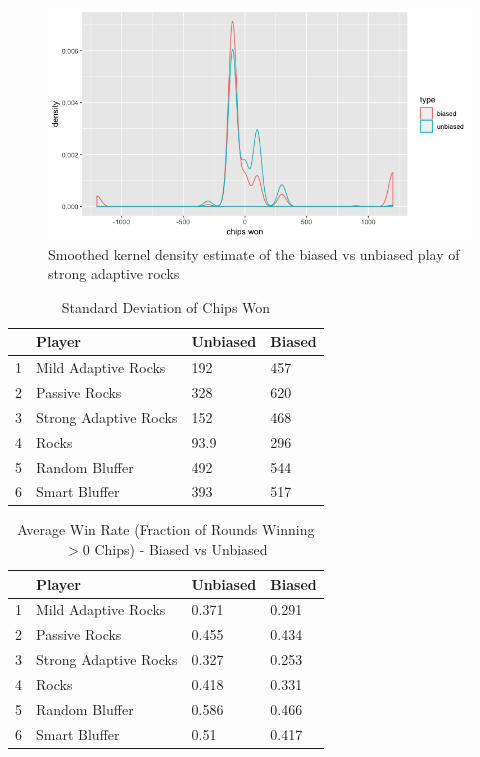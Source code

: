 \documentclass{article}
\begin{document}
\begin{figure}[H]
    \centering
    \includegraphics[scale=0.3]{figures/strong_adaptive_plot}
    \caption{Smoothed kernel density estimate of the biased vs unbiased play of strong adaptive rocks}
    \label{fig:strong_adaptive}
\end{figure}


\begin{table}
\centering
\begin{tabular}{rlll}
  \hline
 & Player & Unbiased & Biased \\ 
  \hline
1 & Mild Adaptive Rocks & 192 & 457 \\ 
  2 & Passive Rocks & 328 & 620 \\ 
  3 & Strong Adaptive Rocks & 152 & 468 \\ 
  4 & Rocks & 93.9 & 296 \\ 
  5 & Random Bluffer & 492 & 544 \\ 
  6 & Smart Bluffer & 393 & 517 \\ 
   \hline
\end{tabular}
\caption{Standard Deviation of Chips Won}
\label{table:sd_chips}
\end{table}


\begin{table}
\centering
\begin{tabular}{rlll}
  \hline
 & Player & Unbiased & Biased \\ 
  \hline
1 & Mild Adaptive Rocks & 0.371 & 0.291 \\ 
  2 & Passive Rocks & 0.455 & 0.434 \\ 
  3 & Strong Adaptive Rocks & 0.327 & 0.253 \\ 
  4 & Rocks & 0.418 & 0.331 \\ 
  5 & Random Bluffer & 0.586 & 0.466 \\ 
  6 & Smart Bluffer & 0.51 & 0.417 \\ 
   \hline
\end{tabular}
\caption{Average Win Rate (Fraction of Rounds Winning $> 0$ Chips) - Biased vs Unbiased}
\label{table:win_rate}
\end{table}
\end{document}
